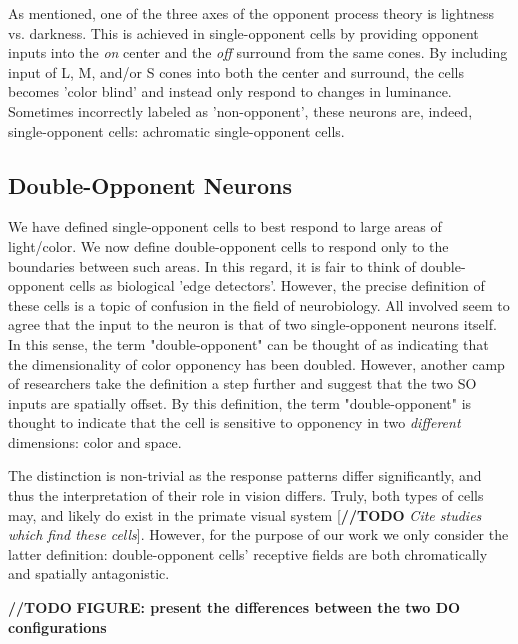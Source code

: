 \documentclass[journal,onecolumn]{IEEEtran}
\begin{document}
As mentioned, one of the three axes of the opponent process theory is lightness vs. darkness. This is achieved in single-opponent cells by providing opponent inputs into the \textit{on} center and the \textit{off} surround from the same cones. By including input of L, M, and/or S cones into both the center and surround, the cells becomes 'color blind' and instead only respond to changes in luminance. Sometimes incorrectly labeled as 'non-opponent', these neurons are, indeed, single-opponent cells: achromatic single-opponent cells.


\subsection*{Double-Opponent Neurons}

We have defined single-opponent cells to best respond to large areas of light/color. We now define double-opponent cells to respond only to the boundaries between such areas. In this regard, it is fair to think of double-opponent cells as biological 'edge detectors'. However, the precise definition of these cells is a topic of confusion in the field of neurobiology. All involved seem to agree that the input to the neuron is that of two single-opponent neurons itself. In this sense, the term "double-opponent" can be thought of as indicating that the dimensionality of color opponency has been doubled. However, another camp of researchers take the definition a step further and suggest that the two SO inputs are spatially offset. By this definition, the term "double-opponent" is thought to indicate that the cell is sensitive to opponency in two \textit{different} dimensions: color and space.

The distinction is non-trivial as the response patterns differ significantly, and thus the interpretation of their role in vision differs. Truly, both types of cells may, and likely do exist in the primate visual system [\textbf{//TODO} \textit{Cite studies which find these cells}]. However, for the purpose of our work we only consider the latter definition: double-opponent cells' receptive fields are both chromatically and spatially antagonistic.

\bigskip

\textbf{//TODO} \textbf{FIGURE: present the differences between the two DO configurations}

\bigskip
\end{document}
